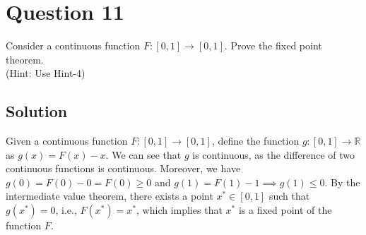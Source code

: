 \section*{Question 11}

Consider a continuous function \( F: [0,1] \rightarrow [0,1] \).
Prove the fixed point theorem. \\
(Hint: Use Hint-4)

\subsection*{Solution}

Given a continuous function \( F: [0,1] \rightarrow [0,1] \), define the function \( g: [0,1] \rightarrow \mathbb{R} \) as \( g(x) = F(x) - x \).
We can see that \( g \) is continuous, as the difference of two continuous functions is continuous.
Moreover, we have \( g(0) = F(0) - 0 = F(0) \geq 0 \) and \( g(1) = F(1) - 1 \implies g(1) \leq 0 \).
By the intermediate value theorem, there exists a point \( x^* \in [0,1] \) such that \( g(x^*) = 0 \), i.e., \( F(x^*) = x^* \), which implies that \( x^* \) is a fixed point of the function \( F \).
